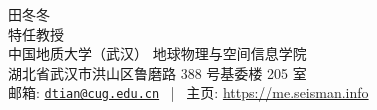\documentclass[11pt, a4paper]{article}
\makeatletter
\newcommand{\MyName}{田冬冬}
\newcommand{\MyRole}{特任教授}
\newcommand{\Email}{dtian@cug.edu.cn}
\newcommand{\Website}{https://me.seisman.info}
\newcommand{\Affiliation}{中国地质大学（武汉）\hspace{1ex} 地球物理与空间信息学院}
\newcommand{\Address}{湖北省武汉市洪山区鲁磨路 388 号基委楼 205 室}
\newcommand{\makefield}[2]{\makebox[1.5em]{\color{MarkerColour!80!black}#1} #2}
\makeatother
\begin{document}
\thispagestyle{empty}

\begin{center}
    \kaishu
    {\fontsize{28pt}{0}\selectfont \MyName}
    \\[0.5cm]
    {\fontsize{17pt}{0}\selectfont \MyRole}
    \\[0.3cm]
    {\fontsize{13pt}{0}\selectfont
        \Affiliation
        \\[0.2cm]
        \Address
        \\[0.08cm]
        邮箱: \href{mailto:\Email}{\texttt{\Email}}
        \, | \,
        主页: \url{\Website}
    }
\end{center}











\end{document}
